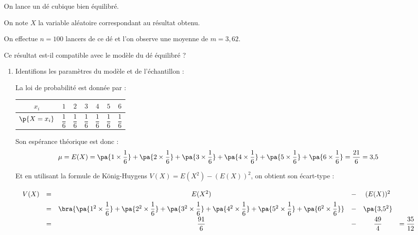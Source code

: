 \begin{methode}
	On lance un dé cubique bien équilibré.

	On note $X$ la variable aléatoire correspondant au résultat obtenu.

	On effectue $n = 100$ lancers de ce dé et l'on observe une moyenne de $m = 3{,}62$.

	Ce résultat est-il compatible avec le modèle du dé équilibré ?

	\begin{correction}
		\nline
		\begin{enumerate}
			\item Identifions les paramètres du modèle et de l'échantillon :

			      La loi de probabilité est donnée par :

			      \begin{center}
				      \begin{tabular}{|c|c|c|c|c|c|c|} \hline
					      \ccg$x_i$                               & $1$            & $2$            & $3$            & $4$            & $5$            & $6$            \\ \hline
					      \ccg\rule[-4mm]{0mm}{11mm}$\p{X = x_i}$ & $\dfrac{1}{6}$ & $\dfrac{1}{6}$ & $\dfrac{1}{6}$ & $\dfrac{1}{6}$ & $\dfrac{1}{6}$ & $\dfrac{1}{6}$ \\ \hline
				      \end{tabular}
			      \end{center}

			      \ms

			      Son espérance théorique est donc :
			      \[
				      \mu = E(X) = \pa{1 \times \dfrac{1}{6}} + \pa{2 \times \dfrac{1}{6}} + \pa{3 \times \dfrac{1}{6}} + \pa{4 \times \dfrac{1}{6}} + \pa{5 \times \dfrac{1}{6}} + \pa{6 \times \dfrac{1}{6}} = \dfrac{21}{6} = 3{,}5
			      \]

			      Et en utilisant la formule de König-Huygens $V(X) = E(X^2) - (E(X))^2$, on obtient son écart-type :
			      \[
				      \def\arraystretch{1.8}
				      \begin{array}{rccccl}
					      V(X) & = & E(X^2)                                                                                                                                                                                        & - & (E(X))^2      &                  \\
					           & = & \bra{\pa{1^2 \times \dfrac{1}{6}} + \pa{2^2 \times \dfrac{1}{6}} + \pa{3^2 \times \dfrac{1}{6}} + \pa{4^2 \times \dfrac{1}{6}} + \pa{5^2 \times \dfrac{1}{6}} + \pa{6^2 \times \dfrac{1}{6}}} & - & \pa{3{,}5^2}  &                  \\
					           & = & \dfrac{91}{6}                                                                                                                                                                                 & - & \dfrac{49}{4} & = \dfrac{35}{12} \\
				      \end{array}
			      \]


\end{enumerate}
\end{correction}
\end{methode}
